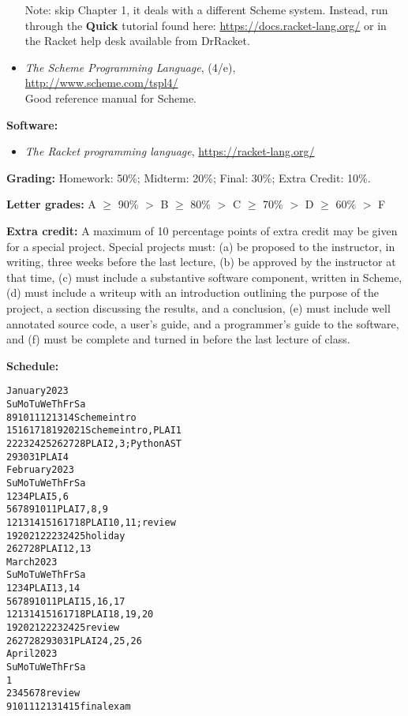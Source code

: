 \documentclass{article}
\newcommand{\myitem}[1]{\item{\bf #1}}
\begin{document}
\begin{description}
\begin{itemize}
Note: skip Chapter 1, it deals with a different Scheme system.
Instead, run through the {\bf Quick} tutorial found
here: \url{https://docs.racket-lang.org/} or in
the Racket help desk available from DrRacket.

\item {\em The Scheme Programming Language}, (4/e),\\
\url{http://www.scheme.com/tspl4/}\\
Good reference manual for Scheme.
\end{itemize}

\myitem{Software:} 
\begin{itemize}
\item {\em The Racket programming language}, 
\url{https://racket-lang.org/}
\end{itemize}

\myitem{Grading:}
Homework: 50\%; Midterm: 20\%; Final: 30\%; Extra Credit: 10\%.

\myitem{Letter grades:}
A $\ge$ 90\% $>$ B $\ge$ 80\% $>$ C $\ge$ 70\% $>$ D $\ge$ 60\% $>$ F

\myitem{Extra credit:} A maximum of 10 percentage points of extra
credit may be given for a special project.  Special projects must: (a)
be proposed to the instructor, in writing, three weeks before the last
lecture, (b) be approved by the instructor at that time, (c) must
include a substantive software component, written in Scheme, (d) must
include a writeup with an introduction outlining the purpose of the
project, a section discussing the results, and a conclusion,
(e) must include well annotated source code, a user's guide, and a
programmer's guide to the software, and (f) must be complete and
turned in before the last lecture of class.

\newpage
\myitem{Schedule:}
\begin{alltt} \large
    January 2023
Su Mo Tu We Th Fr Sa
 8  9 10 11 12 13 14  Scheme intro
15 {\color{red}16} 17 18 19 20 21  Scheme intro, PLAI 1
22 23 24 25 26 27 28  PLAI 2,3; Python AST
29 30 31              PLAI 4
    February 2023
Su Mo Tu We Th Fr Sa
          1  2  3  4  PLAI 5,6
 5  6  7  8  9 10 11  PLAI 7,8,9
12 13 14 15 16 17 18  PLAI 10,11; review
19 {\color{red}20 21 22 23 24} 25  holiday
26 27 28              PLAI 12,13
     March 2023
Su Mo Tu We Th Fr Sa
          1  2  3  4  PLAI 13,14
 5  6  7  8  9 10 11  PLAI 15,16,17
12 13 14 15 16 17 18  PLAI 18,19,20
19 20 21 22 23 24 25  review
26 27 28 29 30 31     PLAI 24,25,26
     April 2023
Su Mo Tu We Th Fr Sa
                   1
 2  3  4  5  6  7  8  review
 9 {\color{red}10 11 12 13 14} 15  final exam
\end{alltt}


\end{description}
\end{document}
